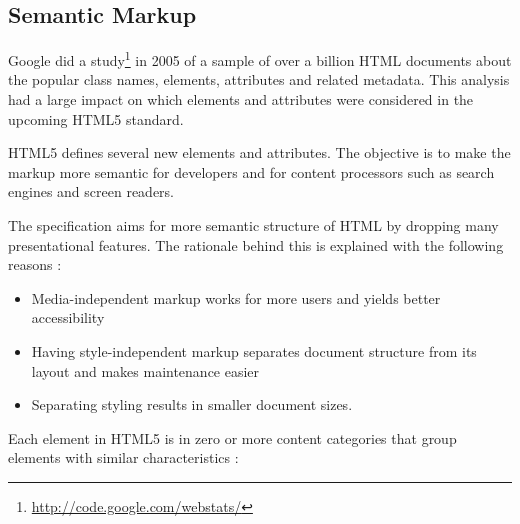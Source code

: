 \subsection{Semantic Markup}

Google did a study\footnote{\url{http://code.google.com/webstats/}} in
2005 of a sample of over a billion HTML documents about the popular
class names, elements, attributes and related metadata. This analysis
had a large impact on which elements and attributes were considered in
the upcoming HTML5 standard.

HTML5 defines several new elements and attributes. The objective is to
make the markup more semantic for developers and for content
processors such as search engines and screen readers.

The specification aims for more semantic structure of HTML by dropping
many presentational features. The rationale behind this is explained
with the following reasons \cite{HTML5draft}:

\begin{itemize}
\item Media-independent markup works for more users and yields better
  accessibility
\item Having style-independent markup separates document structure
  from its layout and makes maintenance easier
\item Separating styling results in smaller document sizes.
\end{itemize}

\noindent Each element in HTML5 is in zero or more content categories
that group elements with similar characteristics \cite{HTML5draft}:

